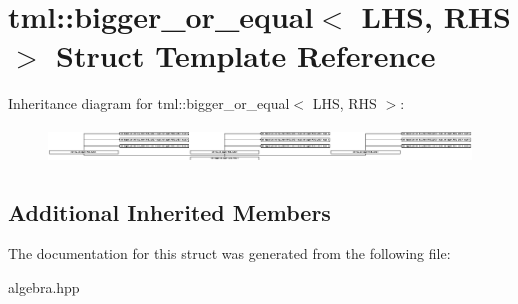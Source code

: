 \hypertarget{structtml_1_1bigger__or__equal}{\section{tml\+:\+:bigger\+\_\+or\+\_\+equal$<$ L\+H\+S, R\+H\+S $>$ Struct Template Reference}
\label{structtml_1_1bigger__or__equal}
}
Inheritance diagram for tml\+:\+:bigger\+\_\+or\+\_\+equal$<$ L\+H\+S, R\+H\+S $>$\+:\begin{figure}[H]
\begin{center}
\leavevmode
\includegraphics[height=0.946586cm]{structtml_1_1bigger__or__equal}
\end{center}
\end{figure}
\subsection*{Additional Inherited Members}


The documentation for this struct was generated from the following file\+:\begin{DoxyCompactItemize}
\item 
algebra.\+hpp\end{DoxyCompactItemize}
